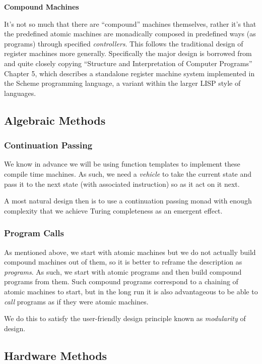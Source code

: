 \documentclass[twoside]{article}
\newcommand{\strong}[1]{{\bfseries #1}}
\begin{document}
\strong{Compound Machines}

It's not so much that there are ``compound'' machines themselves, rather it's that the predefined atomic machines
are monadically composed in predefined ways (as programs) through specified \emph{controllers}. This follows the
traditional design of register machines more generally. Specifically the major design is borrowed from and quite
closely copying ``Structure and Interpretation of Computer Programs'' Chapter 5, which describes a standalone register
machine system implemented in the Scheme programming language, a variant within the larger LISP style of languages.

\subsection*{Algebraic Methods}

\subsubsection*{Continuation Passing}

We know in advance we will be using function templates to implement these compile time machines.
As such, we need a \emph{vehicle} to take the current state and pass it to the next state
(with associated instruction) so as it act on it next.

A most natural design then is to use a continuation passing monad with enough complexity that we achieve Turing
completeness as an emergent effect.

\subsubsection*{Program Calls}

As mentioned above, we start with atomic machines but we do not actually build compound machines out of them,
so it is better to reframe the description as \emph{programs}. As such, we start with atomic programs and then
build compound programs from them. Such compound programs correspond to a chaining of atomic machines to start,
but in the long run it is also advantageous to be able to \emph{call} programs as if they were atomic machines.

We do this to satisfy the user-friendly design principle known as \emph{modularity} of design.

\subsection*{Hardware Methods}
\end{document}
